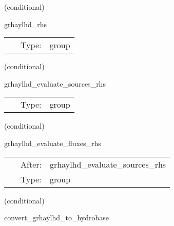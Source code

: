    (conditional) 

\hspace{5mm} grhaylhd\_rhs 

\hspace{5mm}{\it evaluate rhss grhd equations } 


\hspace{5mm}

 \begin{tabular*}{160mm}{cll} 
~ & Type:  & group \\ 
\end{tabular*} 


\vspace{5mm}

   (conditional) 

\hspace{5mm} grhaylhd\_evaluate\_sources\_rhs 

\hspace{5mm}{\it evaluate source terms in grhd rhss } 


\hspace{5mm}

 \begin{tabular*}{160mm}{cll} 
~ & Type:  & group \\ 
\end{tabular*} 


\vspace{5mm}

   (conditional) 

\hspace{5mm} grhaylhd\_evaluate\_fluxes\_rhs 

\hspace{5mm}{\it evaluate flux terms in grhd rhss } 


\hspace{5mm}

 \begin{tabular*}{160mm}{cll} 
~ & After:  & grhaylhd\_evaluate\_sources\_rhs \\ 
~ & Type:  & group \\ 
\end{tabular*} 


\vspace{5mm}

   (conditional) 

\hspace{5mm} convert\_grhaylhd\_to\_hydrobase 

\hspace{5mm}{\it convert needed hydrobase variables for nrpyleakage } 


